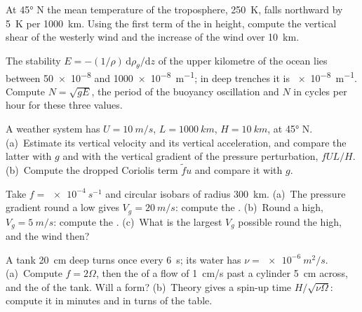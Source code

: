 \begin{exercise}[$\star$]\label{exo:b3:gfd-foundations:3}
At \ang{45} N the mean temperature of the troposphere, \qty{250}{K}, falls
northward by \qty{5}{K} per \qty{1000}{km}. Using the first term of the
 in height, compute the vertical shear of the westerly wind and
the increase of the wind over \qty{10}{km}.
\end{exercise}

\begin{exercise}[$\star$]\label{exo:b3:gfd-foundations:4}
The stability $E = -(1/\rho)\,\mathrm d\rho_\theta/\mathrm dz$ of the upper
kilometre of the ocean lies between \num{50e-8} and \qty{1000e-8}{m^{-1}};
in deep trenches it is \qty{e-8}{m^{-1}}. Compute $N = \sqrt{gE}$, the
period of the buoyancy oscillation and $N$ in cycles per hour for these
three values.
\end{exercise}

\begin{exercise}[$\star\star$]\label{exo:b3:gfd-foundations:5}
A weather system has $U = \qty{10}{m/s}$, $L = \qty{1000}{km}$, $H =
\qty{10}{km}$, at \ang{45} N. (a)~Estimate its vertical velocity and its
vertical acceleration, and compare the latter with $g$ and with the
vertical gradient of the pressure perturbation, $fUL/H$. (b)~Compute the
dropped Coriolis term $\tilde fu$ and compare it with $g$.
\end{exercise}

\begin{exercise}[$\star\star$]\label{exo:b3:gfd-foundations:6}
Take $f = \qty{e-4}{s^{-1}}$ and circular isobars of radius
\qty{300}{km}. (a)~The pressure gradient round a low gives $V_g =
\qty{20}{m/s}$: compute the . (b)~Round a high,
$V_g = \qty{5}{m/s}$: compute the . (c)~What is the largest
$V_g$ possible round the high, and the wind then?
\end{exercise}

\begin{exercise}[$\star\star$]\label{exo:b3:gfd-foundations:7}
A tank \qty{20}{cm} deep turns once every \qty{6}{s}; its water has $\nu =
\qty{e-6}{m^2/s}$. (a)~Compute $f = 2\Omega$, then the  of a
flow of \qty{1}{cm/s} past a cylinder \qty{5}{cm} across, and the  of the tank. Will a  form? (b)~Theory gives a spin-up
time $H/\sqrt{\nu\Omega}$: compute it in minutes and in turns of the table.
\end{exercise}


